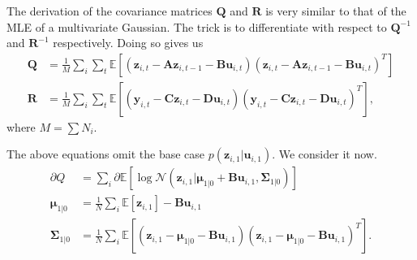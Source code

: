 \documentclass[a4paper,11pt]{article}
\begin{document}
The derivation of the covariance matrices $\mathbf{Q}$ and $\mathbf{R}$ is very similar to that of
the MLE of a multivariate Gaussian. The trick is to differentiate with respect to
$\mathbf{Q}^{-1}$ and $\mathbf{R}^{-1}$ respectively. Doing so gives us
\begin{align*}
	\mathbf{Q} &= \frac{1}{M}\sum\limits_i\sum\limits_t
	\mathbb{E}\left[
		\left(
			\mathbf{z}_{i,t} - \mathbf{Az}_{i,t-1} - \mathbf{Bu}_{i,t}
		\right)\left(
			\mathbf{z}_{i,t} - \mathbf{Az}_{i,t-1} - \mathbf{Bu}_{i,t}
		\right)^T
	\right] \\
	\mathbf{R} &= \frac1M \sum\limits_i\sum\limits_t
	\mathbb{E}\left[
		\left(
			\mathbf{y}_{i,t} - \mathbf{Cz}_{i,t} - \mathbf{Du}_{i,t}
		\right)\left(
			\mathbf{y}_{i,t} - \mathbf{Cz}_{i,t} - \mathbf{Du}_{i,t}
		\right)^T
	\right],
\end{align*}
where $M = \sum N_i$.

The above equations omit the base case $p(\mathbf{z}_{i,1}|\mathbf{u}_{i,1})$. We
consider it now.
\begin{align*}
	\partial Q &= \sum\limits_i \partial\mathbb{E}\left[
		\log \mathcal{N}\left(
			\mathbf{z}_{i,1}
			| \boldsymbol{\mu}_{1|0} + \mathbf{Bu}_{i,1}, \boldsymbol{\Sigma}_{1|0}
		\right)
	\right] \\
	\boldsymbol{\mu}_{1|0} &= \frac1N \sum\limits_i
	\mathbb{E}\left[ \mathbf{z}_{i,1} \right] - \mathbf{Bu}_{i,1} \\
	\boldsymbol{\Sigma}_{1|0} &= \frac1N \sum\limits_i \mathbb{E}\left[
		\left(
			\mathbf{z}_{i,1} - \boldsymbol{\mu}_{1|0} - \mathbf{Bu}_{i,1}
		\right)\left(
			\mathbf{z}_{i,1} - \boldsymbol{\mu}_{1|0} - \mathbf{Bu}_{i,1}
		\right)^T
	\right].
\end{align*}
\end{document}
